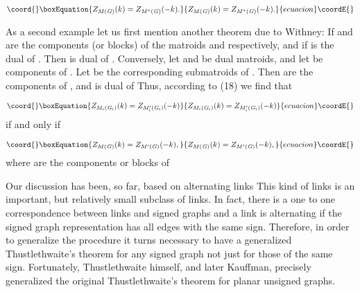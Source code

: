 \documentclass[a4paper,12pt]{article}
\begin{document}
\begin{equation}\coord{}\boxEquation{
Z_{M(\mathit{G)}}(k)=Z_{M^{\ast }(\mathit{G)}}(-k).  \label{18}
}{
Z_{M(\mathit{G)}}(k)=Z_{M^{\ast }(\mathit{G)}}(-k).  }{ecuacion}\coordE{}\end{equation}

As a second example let us first mention another theorem due to Withney:\coordHE{} If \coordHE{} and \coordHE{}
are the components (or blocks) of the matroids \coordHE{} and \coordHE{}
respectively, and if \coordHE{} is the dual of \coordHE{}  \coordHE{}. Then \coordHE{} is dual of \coordHE{}. Conversely, let \coordHE{} and \coordHE{} be dual matroids, and let \coordHE{} be components of \coordHE{}%
. Let \coordHE{} be the corresponding
submatroids of \coordHE{}. Then \coordHE{}
are the components of \coordHE{}, and \coordHE{} is dual of \coordHE{} Thus, according to (18) we find that

\begin{equation}\coord{}\boxEquation{
Z_{M_{i}(\mathit{G}_{i}\mathit{)}}(k)=Z_{M_{i}^{\prime }(\mathit{G}_{i}
\mathit{)}}(-k)  \label{19}
}{
Z_{M_{i}(\mathit{G}_{i}\mathit{)}}(k)=Z_{M_{i}^{\prime }(\mathit{G}_{i}
\mathit{)}}(-k)  }{ecuacion}\coordE{}\end{equation}
if and only if

\begin{equation}\coord{}\boxEquation{
Z_{M(\mathit{G)}}(k)=Z_{M^{\prime }(\mathit{G)}}(-k),  \label{20}
}{
Z_{M(\mathit{G)}}(k)=Z_{M^{\prime }(\mathit{G)}}(-k),  }{ecuacion}\coordE{}\end{equation}
where \coordHE{} are the components or blocks of \coordHE{}

Our discussion has been, so far, based on alternating links \coordHE{} This kind
of links is an important, but relatively small subclass of links. In fact,
there is a one to one correspondence between links and signed graphs and a
link is alternating if the signed graph representation has all edges with
the same sign. Therefore, in order to generalize the procedure it turns
necessary to have a generalized Thustlethwaite's \coordHE{} theorem for any
signed graph not just for those of the same sign. Fortunately,
Thustlethwaite himself,\coordHE{} and later Kauffman,\coordHE{} precisely
generalized the original Thustlethwaite's theorem for planar unsigned graphs.
\end{document}
